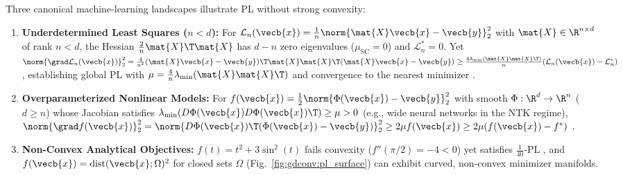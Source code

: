 \documentclass[../../../../master.tex]{subfiles}
\begin{document}
\begin{intuition}
Three canonical machine-learning landscapes illustrate PL without strong convexity:
\begin{enumerate}
  \item \textbf{Underdetermined Least Squares ($n < d$):} For $\mathcal{L}_n(\vecb{x}) = \frac{1}{n}\norm{\mat{X}\vecb{x} - \vecb{y}}_2^2$ with $\mat{X} \in \R^{n \times d}$ of rank $n < d$, the Hessian $\frac{2}{n}\mat{X}\T\mat{X}$ has $d-n$ zero eigenvalues ($\mu_{\mathrm{SC}} = 0$) and $\mathcal{L}_n^* = 0$. Yet $\norm{\grad \mathcal{L}_n(\vecb{x})}_2^2 = \frac{4}{n^2}(\mat{X}\vecb{x}-\vecb{y})\T \mat{X}\mat{X}\T (\mat{X}\vecb{x}-\vecb{y}) \ge \frac{4\lambda_{\min}(\mat{X}\mat{X}\T)}{n}(\mathcal{L}_n(\vecb{x}) - \mathcal{L}_n^*)$, establishing global PL with $\mu = \frac{4}{n}\lambda_{\min}(\mat{X}\mat{X}\T)$ and convergence to the nearest minimizer  .
  \item \textbf{Overparameterized Nonlinear Models:} For $f(\vecb{x}) = \frac{1}{2}\norm{\Phi(\vecb{x}) - \vecb{y}}_2^2$ with smooth $\Phi : \R^d \to \R^n$ ($d \ge n$) whose Jacobian satisfies $\lambda_{\min}(D\Phi(\vecb{x})D\Phi(\vecb{x})\T) \ge \mu > 0$ (e.g., wide neural networks in the NTK regime), $\norm{\grad f(\vecb{x})}_2^2 = \norm{D\Phi(\vecb{x})\T(\Phi(\vecb{x})-\vecb{y})}_2^2 \ge 2\mu f(\vecb{x}) \ge 2\mu(f(\vecb{x})-f^*)$ .
  \item \textbf{Non-Convex Analytical Objectives:} $f(t) = t^2 + 3\sin^2(t)$ fails convexity ($f''(\pi/2) = -4 < 0$) yet satisfies $\frac{1}{40}$-PL , and $f(\vecb{x}) = \mathrm{dist}(\vecb{x}; \Omega)^2$ for closed sets $\Omega$ (Fig.~\ref{fig:gdconv:pl_surface}) can exhibit curved, non-convex minimizer manifolds.
\end{enumerate}
\end{intuition}
\end{document}
